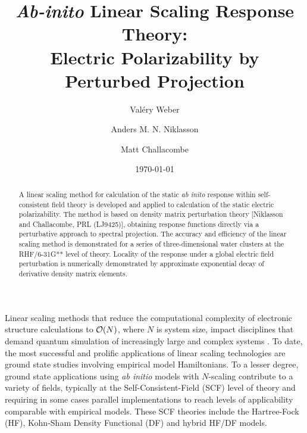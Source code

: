\documentclass[prl,aps,preprint,showpacs,superbib]{revtex4}
\begin{document}
\title{\emph{Ab-inito} Linear Scaling Response Theory: \\ 
             Electric Polarizability by Perturbed Projection }

\author{Val\'ery Weber}
\author{Anders M. N. Niklasson}
\author{Matt Challacombe}

\date{\today}

\begin{abstract}
A linear scaling method for calculation of the static {\em ab inito} response within self-consistent field theory 
is developed and applied to calculation of the static electric polarizability.  The method is based on 
density matrix perturbation theory [Niklasson and Challacombe, PRL (LJ9425)], obtaining  response functions
directly via a perturbative approach to spectral projection.  The accuracy and efficiency of the linear scaling 
method is demonstrated for a series of three-dimensional 
water clusters at the RHF/6-31G** level of theory.  Locality of the response under a global electric field 
perturbation is numerically demonstrated by approximate exponential decay of derivative density matrix elements.
\end{abstract}


\maketitle


Linear scaling methods that reduce the computational complexity of 
electronic structure calculations to ${\cal O}(N)$, where $N$ is system size, 
impact disciplines that demand quantum simulation of increasingly large and complex systems
\cite{GenLinScale}
. 
To date, the most successful and prolific applications of linear scaling technologies are
ground state studies involving empirical model Hamiltonians.  
To a lesser degree, ground state applications using {\em ab initio} models 
with $N$-scaling contribute to a variety of fields, typically at the
Self-Consistent-Field (SCF) level of theory and requiring in some cases parallel 
implementations to reach levels of applicability comparable with empirical models. 
These SCF theories include the Hartree-Fock (HF), Kohn-Sham Density Functional (DF) 
and hybrid HF/DF models.
\end{document}
